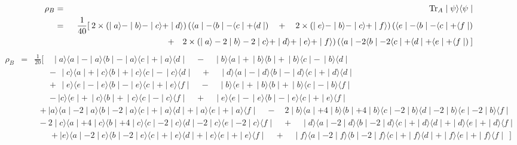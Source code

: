 \documentclass[10pt]{article}
\newcommand{\ra}{\rangle}
\newcommand{\la}{\langle}
\newcommand{\ket}[1]{ \mid  #1 \ra}
\newcommand{\bra}[1]{ \la #1 \mid}
\newcommand{\kb}[2]{\mid \! #1 \ra \la #2 \!\mid}
\begin{document}
\begin{eqnarray*}
	\rho_B &=& {\rm Tr}_A \ket{\psi}\bra{\psi} \\
		&=& \frac{1}{40}[ \:2\times \left( \ket{a} - \ket{b} -\ket{c} + \ket{d} \right)\left(\bra{a}-\bra{b}-\bra{c}+\bra{d}\right)\quad + \quad
			2\times\left( \ket{e} - \ket{b} -\ket{c} + \ket{f} \right)\left(\bra{e}-\bra{b}-\bra{c}+\bra{f}\right) \\
		&&  \qquad\qquad\qquad\qquad\qquad\quad\:\:+ \quad 2\times \left(\ket{a}-2\ket{b}-2\ket{c}+\ket{d}+\ket{e}+\ket{f}\right)
			\left(\bra{a}-2\bra{b}-2\bra{c}+\bra{d}+\bra{e}+\bra{f}\right)\:]
\end{eqnarray*}
\newpage
\begin{eqnarray*}
	\rho_B&=& \frac{1}{20}[\quad\kb{a}{a}-\kb{a}{b}-\kb{a}{c}+\kb{a}{d}\quad-\quad\kb{b}{a}+\,\kb{b}{b}+\,\kb{b}{c}-\,\kb{b}{d} \\
		&&    \quad\:\:\,-\,\kb{c}{a}+\kb{c}{b}+\kb{c}{c}-\,\kb{c}{d} \quad+ \quad \kb{d}{a}-\kb{d}{b}-\kb{d}{c}+\kb{d}{d} \\
		&&    \quad\:\:\,+\,\kb{e}{e}-\kb{e}{b}-\kb{e}{c}+\kb{e}{f} \quad-\quad \kb{b}{e}+\,\kb{b}{b}+\,\kb{b}{c}-\kb{b}{f} \\
		&&    \quad\:\:\,-\kb{c}{e}+\,\kb{c}{b}+\,\kb{c}{c}-\kb{c}{f}\quad+\quad\kb{e}{e}-\,\kb{e}{b}-\kb{e}{c}+\kb{e}{f} \\
		&& 	\:\: +\kb{a}{a}-2\kb{a}{b}-2\kb{a}{c}+\kb{a}{d}+\kb{a}{e}+\kb{a}{f}\quad-\quad 2\kb{b}{a}+4\kb{b}{b}+4\kb{b}{c}-2\kb{b}{d}-2\kb{b}{e}-2\kb{b}{f} \\
		&&    \:\: -2\kb{c}{a}+4\kb{c}{b}+4\kb{c}{c}-2\kb{c}{d}-2\kb{c}{e}-2\kb{c}{f}\quad+\quad\kb{d}{a}-2\kb{d}{b}-2\kb{d}{c}+\kb{d}{d}+\kb{d}{e}+\kb{d}{f} \\
		&&  	\:\quad\:\:\, +\kb{e}{a}-2\kb{e}{b}-2\kb{e}{c}+\kb{e}{d}+\kb{e}{e}+\kb{e}{f}\quad+\quad\kb{f}{a}-2\kb{f}{b}-2\kb{f}{c}+\kb{f}{d}+\kb{f}{e}+\kb{f}{f} \:\:] \\ \\
\end{eqnarray*}
\end{document}
